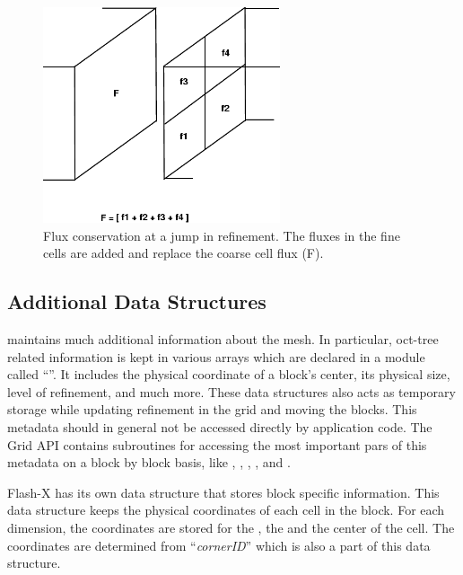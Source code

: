 \begin{figure}
\begin{center}
\includegraphics[height=2.5in]{Grid_flux_cons}
\caption{\label{Fig:flux_conservation_fig}
        Flux conservation at a jump in refinement.  The fluxes in the fine
        cells are added and replace the coarse cell flux (F).}
\end{center}
\end{figure}

\subsection{Additional Data Structures}
\label{Sec:amr data struct}
\Paramesh maintains much additional information about the mesh.
In particular, oct-tree related information is kept 
in various arrays which are declared in a
 module called ``''.
It includes
the physical coordinate of a block's center, its physical size,
level of refinement, and
much more. These data structures also acts as temporary storage while
updating refinement in the grid and moving the blocks.
This metadata should in general not be accessed directly by application code.
The \unit{Grid} API contains subroutines for accessing the most important
pars of this metadata on a block by block basis, like
,
,
,
, and
.

Flash-X has its
own  data structure that stores block specific
information. This data structure keeps the physical coordinates of
each cell in the block. For each dimension, the coordinates are stored
for the , the  and the center of the cell. The
coordinates are determined from ``{\it cornerID}'' which is also a part of
this data structure.

